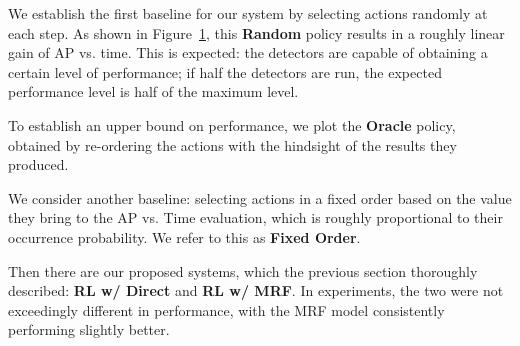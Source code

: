 \begin{figure}[h!]
\centering
{} \hfill
{}
  \label{fig:results1}
\end{figure}

We establish the first baseline for our system by selecting actions randomly at each step.
As shown in Figure~\ref{fig:results1}, this \textbf{Random} policy results in a roughly linear gain of AP vs. time.
This is expected: the detectors are capable of obtaining a certain level of performance; if half the detectors are run, the expected performance level is half of the maximum level.

To establish an upper bound on performance, we plot the \textbf{Oracle} policy, obtained by re-ordering the actions with the hindsight of the results they produced.

We consider another baseline: selecting actions in a fixed order based on the value they bring to the AP vs. Time evaluation, which is roughly proportional to their occurrence probability.
We refer to this as \textbf{Fixed Order}.

Then there are our proposed systems, which the previous section thoroughly described: \textbf{RL w/ Direct} and \textbf{RL w/ MRF}.
In experiments, the two were not exceedingly different in performance, with the MRF model consistently performing slightly better.

